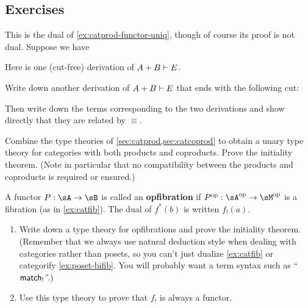 \subsection*{Exercises}

\begin{ex}\label{ex:catcoprod-functor-uniq}
  This is the dual of \cref{ex:catprod-functor-uniq}, though of course its proof is not dual.
  Suppose we have
  Here is one (cut-free) derivation of $A+B\vdash E$.
  Write down another derivation of $A+B\vdash E$ that ends with the following cut:
  Then write down the terms corresponding to the two derivations and show directly that they are related by $\equiv$.
\end{ex}

\begin{ex}\label{ex:cat-prod-coprod}
  Combine the type theories of \cref{sec:catprod,sec:catcoprod} to obtain a unary type theory for categories with both products and coproducts.
  Prove the initiality theorem.
  (Note in particular that no compatibility between the products and coproducts is required or ensured.)
\end{ex}

\begin{ex}\label{ex:cat-opfib}
  A functor $P:\sA\to\sB$ is called an \textbf{opfibration} if $P\op:\sA\op\to\sM\op$ is a fibration (as in \cref{ex:catfib}).
  The dual of $f^*(b)$ is written $f_!(a)$.
  \begin{enumerate}
  \item Write down a type theory for opfibrations and prove the initiality theorem.
    (Remember that we always use natural deduction style when dealing with categories rather than posets, so you can't just dualize \cref{ex:catfib} or categorify \cref{ex:poset-bifib}.
    You will probably want a term syntax such as ``$\mathsf{match}_!$''.)
  \item Use this type theory to prove that $f_!$ is always a functor.
  \end{enumerate}
\end{ex}


